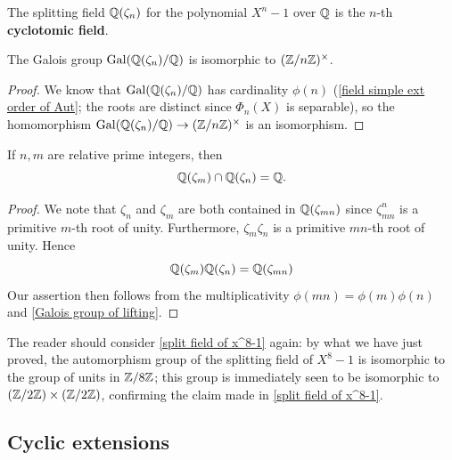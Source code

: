 \begin{definition}
The splitting field $\mathbb{Q}(\zeta_n)$ for the polynomial $X^n-1$ over $\mathbb{Q}$ is the $n$-th \textbf{cyclotomic field}.
\end{definition}
\begin{proposition}\label{Galois group of cyclotomic field}
The Galois group $\mathrm{Gal}(\mathbb{Q}(\zeta_n)/\mathbb{Q})$ is isomorphic to $(\mathbb{Z}/n\mathbb{Z})^\times$.
\end{proposition}
\begin{proof}
We know that $\mathrm{Gal}(\mathbb{Q}(\zeta_n)/\mathbb{Q})$ has cardinality $\phi(n)$ (\cref{field simple ext order of Aut}; the roots
are distinct since $\Phi_n(X)$ is separable), so the homomorphism $\mathrm{Gal}(\mathbb{Q}(\zeta_n)/\mathbb{Q})\to(\mathbb{Z}/n\mathbb{Z})^\times$ is an isomorphism.
\end{proof}
\begin{corollary}
If $n,m$ are relative prime integers, then
\[\mathbb{Q}(\zeta_m)\cap\mathbb{Q}(\zeta_n)=\mathbb{Q}.\]
\end{corollary}
\begin{proof}
We note that $\zeta_n$ and $\zeta_m$ are both contained in $\mathbb{Q}(\zeta_{mn})$ since $\zeta_{mn}^n$ is a primitive $m$-th root of unity. Furthermore, $\zeta_{m}\zeta_n$ is a primitive $mn$-th root of unity. Hence
\[\mathbb{Q}(\zeta_m)\mathbb{Q}(\zeta_n)=\mathbb{Q}(\zeta_{mn})\]
Our assertion then follows from the multiplicativity $\phi(mn)=\phi(m)\phi(n)$ and \cref{Galois group of lifting}.
\end{proof}
\begin{example}
The reader should consider \cref{split field of x^8-1} again: by what we have just proved, the automorphism group of the splitting field of $X^8-1$ is isomorphic to the group of units in $\mathbb{Z}/8\mathbb{Z}$; this group is immediately seen to be isomorphic to $(\mathbb{Z}/2\mathbb{Z})\times(\mathbb{Z}/2\mathbb{Z})$, confirming the claim made in \cref{split field of x^8-1}.
\end{example}
\subsection{Cyclic extensions}

